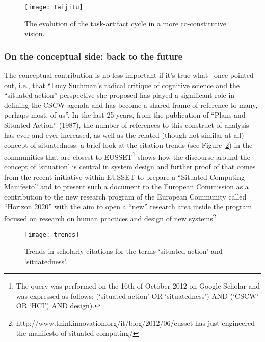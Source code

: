 \documentclass{article}
\begin{document}
\begin{figure}[tbh]
  \centering
      \texttt{[image: Taijitu]}
  \caption{The evolution of the task-artifact cycle in a more co-constitutive vision.}
  \label{fig:yinyang}
\end{figure}





\subsubsection{On the conceptual side: back to the future}

The conceptual contribution is no less important if it's true what~\citet{schmidt_maps_1999} once pointed out, i.e., that ``Lucy Suchman's radical critique of cognitive science and the ``situated action'' perspective she proposed has played a significant role in defining the CSCW agenda and has become a shared frame of reference to many, perhaps most, of us''. In the last 25 years, from the publication of ``Plans and Situated Action'' (1987), the number of references to this construct of analysis has ever and ever increased, as well as the related (though not similar at all) concept of situatedness: a brief look at the citation trends (see Figure~\ref{fig:trends}) in the communities that are closest to EUSSET\footnote{The query was performed on the 16th of October 2012 on Google Scholar and was expressed as follows: (`situated action' OR `situatedness') AND (`CSCW' OR `HCI') AND design).} shows how the discourse around the concept of `situation' is central in system design and further proof of that comes from the recent initiative within EUSSET to prepare a ``Situated Computing Manifesto'' and to present such a document to the European Commission as a contribution to the new research program of the European Community called ``Horizon 2020'' with the aim to open a ``new'' research area inside the program focused on research on human practices and design of new systems\footnote{http://www.thinkinnovation.org/it/blog/2012/06/eusset-has-just-engineered-the-manifesto-of-situated-computing/}.


\begin{figure}[tbh]
  \centering
      \texttt{[image: trends]}
  \caption{Trends in scholarly citations for the terms `situated action' and `situatedness'.}
  \label{fig:trends}
\end{figure}
\end{document}
